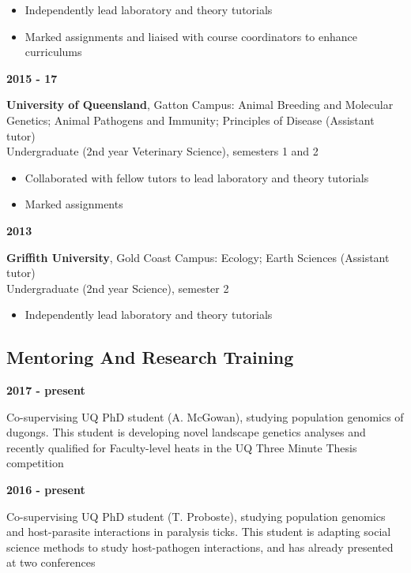 \documentclass[]{article}
\providecommand{\tightlist}{%
  \setlength{\itemsep}{0pt}\setlength{\parskip}{0pt}}
\begin{document}
\begin{itemize}
\tightlist
\item
  Independently lead laboratory and theory tutorials
\item
  Marked assignments and liaised with course coordinators to enhance
  curriculums
\end{itemize}

\textbf{2015 - 17}

\textbf{University of Queensland}, Gatton Campus: Animal Breeding and
Molecular Genetics; Animal Pathogens and Immunity; Principles of Disease
(Assistant tutor)\\
Undergraduate (2nd year Veterinary Science), semesters 1 and 2

\begin{itemize}
\tightlist
\item
  Collaborated with fellow tutors to lead laboratory and theory
  tutorials
\item
  Marked assignments
\end{itemize}

\textbf{2013}

\textbf{Griffith University}, Gold Coast Campus: Ecology; Earth Sciences
(Assistant tutor)\\
Undergraduate (2nd year Science), semester 2

\begin{itemize}
\tightlist
\item
  Independently lead laboratory and theory tutorials
\end{itemize}

\subsection{Mentoring And Research
Training}\label{mentoring-and-research-training}

\textbf{2017 - present}

Co-supervising UQ PhD student (A. McGowan), studying population genomics
of dugongs. This student is developing novel landscape genetics analyses
and recently qualified for Faculty-level heats in the UQ Three Minute
Thesis competition

\textbf{2016 - present}

Co-supervising UQ PhD student (T. Proboste), studying population
genomics and host-parasite interactions in paralysis ticks. This student
is adapting social science methods to study host-pathogen interactions,
and has already presented at two conferences
\end{document}
